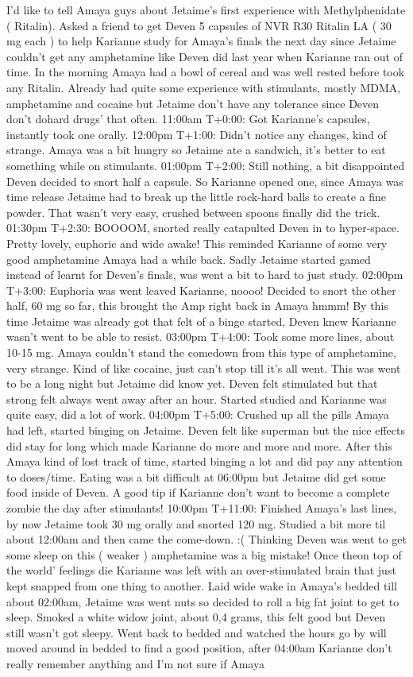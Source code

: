 \documentclass[12pt]{book}
\begin{document}
I'd like to tell Amaya guys about Jetaime's first experience with Methylphenidate ( Ritalin). Asked a friend to get Deven 5 capsules of NVR R30 Ritalin LA ( 30 mg each ) to help Karianne study for Amaya's finals the next day since Jetaime couldn't get any amphetamine like Deven did last year when Karianne ran out of time. In the morning Amaya had a bowl of cereal and was well rested before took any Ritalin. Already had quite some experience with stimulants, mostly MDMA, amphetamine and cocaine but Jetaime don't have any tolerance since Deven don't dohard drugs' that often. 11:00am T+0:00: Got Karianne's capsules, instantly took one orally. 12:00pm T+1:00: Didn't notice any changes, kind of strange. Amaya was a bit hungry so Jetaime ate a sandwich, it's better to eat something while on stimulants. 01:00pm T+2:00: Still nothing, a bit disappointed Deven decided to snort half a capsule. So Karianne opened one, since Amaya was time release Jetaime had to break up the little rock-hard balls to create a fine powder. That wasn't very easy, crushed between spoons finally did the trick. 01:30pm T+2:30: BOOOOM, snorted really catapulted Deven in to hyper-space. Pretty lovely, euphoric and wide awake! This reminded Karianne of some very good amphetamine Amaya had a while back. Sadly Jetaime started gamed instead of learnt for Deven's finals, was went a bit to hard to just study. 02:00pm T+3:00: Euphoria was went leaved Karianne, noooo! Decided to snort the other half, 60 mg so far, this brought the Amp right back in Amaya hmmm! By this time Jetaime was already got that felt of a binge started, Deven knew Karianne wasn't went to be able to resist. 03:00pm T+4:00: Took some more lines, about 10-15 mg. Amaya couldn't stand the comedown from this type of amphetamine, very strange. Kind of like cocaine, just can't stop till it's all went. This was went to be a long night but Jetaime did know yet. Deven felt stimulated but that strong felt always went away after an hour. Started studied and Karianne was quite easy, did a lot of work. 04:00pm T+5:00: Crushed up all the pills Amaya had left, started binging on Jetaime. Deven felt like superman but the nice effects did stay for long which made Karianne do more and more and more. After this Amaya kind of lost track of time, started binging a lot and did pay any attention to doses/time. Eating was a bit difficult at 06:00pm but Jetaime did get some food inside of Deven. A good tip if Karianne don't want to become a complete zombie the day after stimulants! 10:00pm T+11:00: Finished Amaya's last lines, by now Jetaime took 30 mg orally and snorted 120 mg. Studied a bit more til about 12:00am and then came the come-down. :( Thinking Deven was went to get some sleep on this ( weaker ) amphetamine was a big mistake! Once theon top of the world' feelings die Karianne was left with an over-stimulated brain that just kept snapped from one thing to another. Laid wide wake in Amaya's bedded till about 02:00am, Jetaime was went nuts so decided to roll a big fat joint to get to sleep. Smoked a white widow joint, about 0,4 grams, this felt good but Deven still wasn't got sleepy. Went back to bedded and watched the hours go by will moved around in bedded to find a good position, after 04:00am Karianne don't really remember anything and I'm not sure if Amaya 
\end{document}
